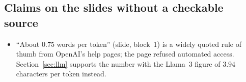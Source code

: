 \subsection*{Claims on the slides without a checkable source}
\begin{itemize}
  \item ``About $0.75$ words per token'' (slide, block~1) is a widely quoted rule of thumb
        from OpenAI's help pages; the page refused automated access. Section~\ref{sec:llm}
        supports the number with the Llama~3 figure of $3.94$ characters per token
         instead.
\end{itemize}
